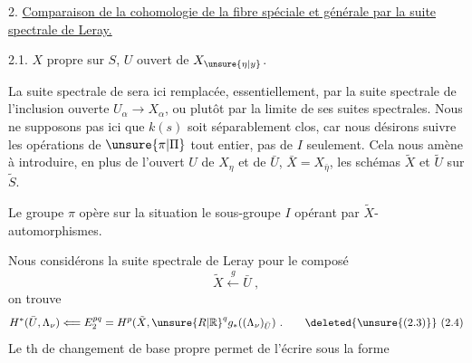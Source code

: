 
2. \uline{Comparaison de la cohomologie de la fibre spéciale et générale par la suite spectrale de Leray.}

2.1. $X$ propre sur $S$, $U$ ouvert de $X_{\unsure{\eta|y}}$.

La suite spectrale de   sera ici remplacée, essentiellement, par la suite spectrale  de l'inclusion ouverte $U_\alpha\longrightarrow X_\alpha$, ou plutôt par la limite de ses suites spectrales.  Nous ne supposons pas ici que $k(s)$ soit séparablement clos, car nous désirons   suivre les opérations de $\unsure{\pi|\Pi}$ tout entier, pas de $I$ seulement. Cela nous amène à introduire, en plus de l'ouvert $U$ de $X_\eta$ et de $\bar U$, $\bar X=X_{\bar\eta}$, les schémas  $\tilde X$ et $\tilde U$ sur $\tilde S$.


 Le groupe $\pi$ opère sur la situation
le sous-groupe $I$ opérant par $\tilde X$-automorphismes.

Nous considérons la suite spectrale de Leray pour le composé 
\[
\tilde X\xleftarrow{g}\bar U\ ,
\tag*{(2,3).}
\]
on trouve
\[
H^*(\bar U,\Lambda_\nu)\Longleftarrow E_2^{pq}=H^p(\tilde X,{\unsure{R|\mathbb R}}^qg_*((\Lambda_\nu)_{\bar U})\ .
\tag*{\deleted{\unsure{(2.3)}} (2.4)}
\]
Le th de changement de base propre permet de l'écrire sous la forme
